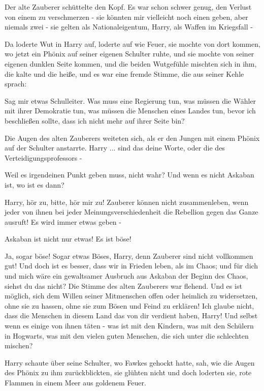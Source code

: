 Der alte Zauberer schüttelte den Kopf. \glqq{}Es war schon schwer genug, den
Verlust von einem zu verschmerzen - sie könnten mir vielleicht noch einen geben,
aber niemals zwei - sie gelten als Nationaleigentum, Harry, als Waffen im
Kriegsfall -\grqq{}

Da loderte Wut in Harry auf, loderte auf wie Feuer, sie mochte von dort kommen,
wo jetzt ein Phönix auf seiner eigenen Schulter ruhte, und sie mochte von seiner
eigenen dunklen Seite kommen, und die beiden Wutgefühle mischten sich in ihm,
die kalte und die heiße, und es war eine fremde Stimme, die aus seiner Kehle
sprach:

\glqq{}Sag mir etwas Schulleiter. Was muss eine Regierung tun, was müssen die
Wähler mit ihrer Demokratie tun, was müssen die Menschen eines Landes tun, bevor
ich beschließen sollte, dass ich nicht mehr auf ihrer Seite bin?\grqq{}

Die Augen des alten Zauberers weiteten sich, als er den Jungen mit einem Phönix
auf der Schulter anstarrte. \glqq{}Harry ... sind das deine Worte, oder die des
Verteidigungsprofessors -\grqq{}

\glqq{}Weil es irgendeinen Punkt geben muss, nicht wahr? Und wenn es nicht
Askaban ist, wo ist es dann?\grqq{}

\glqq{}Harry, hör zu, bitte, hör mir zu! Zauberer können nicht zusammenleben,
wenn jeder von ihnen bei jeder Meinungsverschiedenheit die Rebellion gegen das
Ganze ausruft! Es wird immer etwas geben -\grqq{}

\glqq{}Askaban ist nicht nur etwas! Es ist böse!\grqq{}

\glqq{}Ja, sogar böse! Sogar etwas Böses, Harry, denn Zauberer sind nicht
vollkommen gut! Und doch ist es besser, dass wir in Frieden leben, als im Chaos;
und für dich und mich wäre ein gewaltsamer Ausbruch aus Askaban der Beginn des
Chaos, siehst du das nicht?\grqq{} Die Stimme des alten Zauberers war flehend.
\glqq{}Und es ist möglich, sich dem Willen seiner Mitmenschen offen oder heimlich
zu widersetzen, ohne sie zu hassen, ohne sie zum Bösen und Feind zu erklären!
Ich glaube nicht, dass die Menschen in diesem Land das von dir verdient haben,
Harry! Und selbst wenn es einige von ihnen täten - was ist mit den Kindern, was
mit den Schülern in Hogwarts, was mit den vielen guten Menschen, die sich unter
die schlechten mischen?\grqq{}

Harry schaute über seine Schulter, wo Fawkes gehockt hatte, sah, wie die Augen
des Phönix zu ihm zurückblickten, sie glühten nicht und doch loderten sie, rote
Flammen in einem Meer aus goldenem Feuer.

